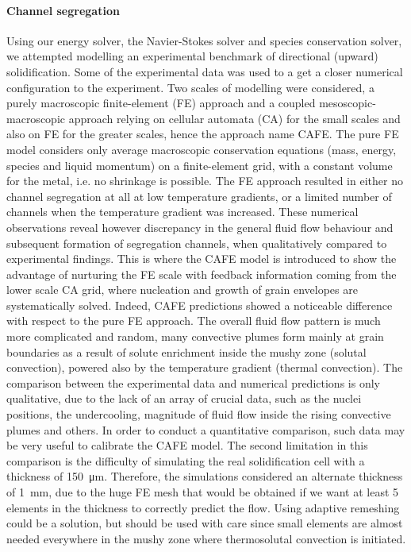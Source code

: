 \paragraph{Channel segregation}
Using our energy solver, the Navier-Stokes solver and species conservation solver, we attempted modelling an experimental benchmark 
of directional (upward)  solidification. Some of the experimental data was used to a get a closer numerical configuration to the experiment.
Two scales of modelling were considered, a purely macroscopic finite-element (FE) approach and a coupled mesoscopic-macroscopic approach
relying on cellular automata (CA) for the small scales and also on FE for the greater scales, hence the approach name CAFE. 
The pure FE model considers only average macroscopic conservation equations (mass, energy, species and liquid momentum) 
on a finite-element grid, with a constant volume for the metal, i.e. no shrinkage is possible. 
The FE approach resulted in either no channel segregation at all at low temperature gradients, or a limited number of channels when
the temperature gradient was increased. These numerical observations reveal however discrepancy in the general fluid flow behaviour and 
subsequent formation of segregation channels, when qualitatively compared to experimental findings.
This is where the CAFE model is introduced to show the advantage of nurturing the FE scale with feedback information coming from
the lower scale CA grid, where nucleation and growth of grain envelopes are systematically solved.
Indeed, CAFE predictions showed a noticeable difference with respect to the pure FE approach. The overall fluid flow pattern is 
much more complicated and random, many convective plumes form mainly at grain boundaries as a result of solute enrichment inside the mushy zone (solutal convection),
powered also by the temperature gradient (thermal convection).   
The comparison between the experimental data and numerical predictions is only qualitative, due to the lack of an array of crucial data, such 
as the nuclei positions, the undercooling, magnitude of fluid flow inside the rising convective plumes and others.
In order to conduct a quantitative comparison, such data may be very useful to calibrate the CAFE model.
The second limitation in this comparison is the difficulty of simulating the real solidification cell with a thickness of \SI{150}{\micro \metre}.
Therefore, the simulations considered an alternate thickness of \SI{1}{\milli \metre}, due to the huge FE mesh that would be obtained if
we want at least 5 elements in the thickness to correctly predict the flow. Using adaptive remeshing could be a solution, but should be used
with care since small elements are almost needed everywhere in the mushy zone where thermosolutal convection is initiated.   

